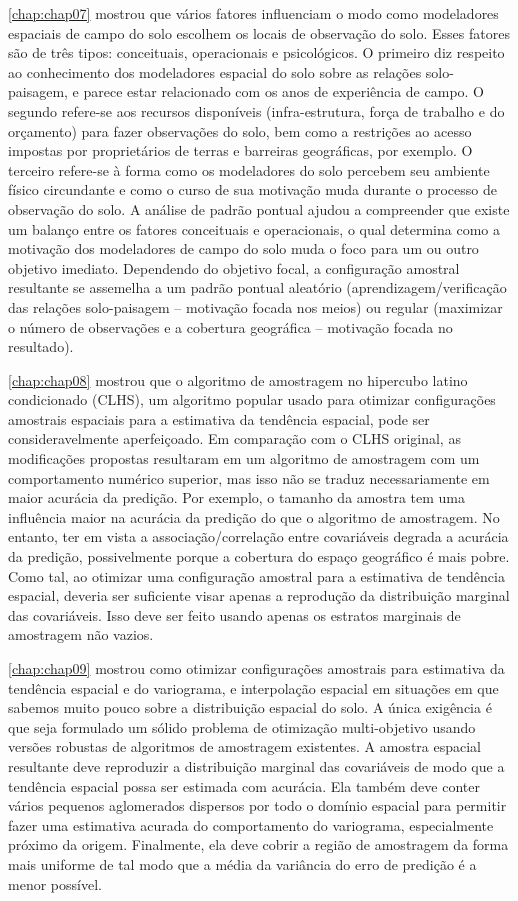 \autoref{chap:chap07} mostrou que vários fatores influenciam o modo como modeladores espaciais de campo 
do solo escolhem os locais de observação do solo. Esses fatores são de três tipos: conceituais, 
operacionais e psicológicos. O primeiro diz respeito ao conhecimento dos modeladores espacial do solo sobre as 
relações solo-paisagem, e parece estar relacionado com os anos de experiência de campo. O segundo refere-se 
aos recursos disponíveis (infra-estrutura, força de trabalho e do orçamento) para fazer observações do solo, 
bem como a restrições ao acesso impostas por proprietários de terras e barreiras geográficas, por exemplo. 
O terceiro refere-se à forma como os modeladores do solo percebem seu ambiente físico circundante e como o 
curso de sua motivação muda durante o processo de observação do solo. A análise de padrão pontual ajudou a 
compreender que existe um balanço entre os fatores conceituais e operacionais, o qual determina como a 
motivação dos modeladores de campo do solo muda o foco para um ou outro objetivo imediato. Dependendo do 
objetivo focal, a configuração amostral resultante se assemelha a um padrão pontual aleatório 
(aprendizagem/verificação das relações solo-paisagem -- motivação focada nos meios) ou regular (maximizar o 
número de observações e a cobertura geográfica -- motivação focada no resultado).

\autoref{chap:chap08} mostrou que o algoritmo de amostragem no hipercubo latino condicionado (CLHS), um 
algoritmo popular usado para otimizar configurações amostrais espaciais para a estimativa da tendência 
espacial, pode ser consideravelmente aperfeiçoado. Em comparação com o CLHS original, as modificações propostas 
resultaram em um algoritmo de amostragem com um comportamento numérico superior, mas isso não se traduz 
necessariamente em maior acurácia da predição. Por exemplo, o tamanho da amostra tem uma influência maior na 
acurácia da predição do que o algoritmo de amostragem. No entanto, ter em vista a associação/correlação entre 
covariáveis degrada a acurácia da predição, possivelmente porque a cobertura do espaço geográfico é mais pobre. 
Como tal, ao otimizar uma configuração amostral para a estimativa de tendência espacial, deveria ser suficiente 
visar apenas a reprodução da distribuição marginal das covariáveis. Isso deve ser feito usando apenas os 
estratos marginais de amostragem não vazios.

\autoref{chap:chap09} mostrou como otimizar configurações amostrais para estimativa da tendência espacial e do 
variograma, e interpolação espacial em situações em que sabemos muito pouco sobre a distribuição espacial do 
solo. A única exigência é que seja formulado um sólido problema de otimização multi-objetivo usando versões 
robustas de algoritmos de amostragem existentes. A amostra espacial resultante deve reproduzir a distribuição 
marginal das covariáveis de modo que a tendência espacial possa ser estimada com acurácia. Ela também deve 
conter vários pequenos aglomerados dispersos por todo o domínio espacial para permitir fazer uma estimativa 
acurada do comportamento do variograma, especialmente próximo da origem. Finalmente, ela deve cobrir a região 
de amostragem da forma mais uniforme de tal modo que a média da variância do erro de predição é a menor 
possível.

